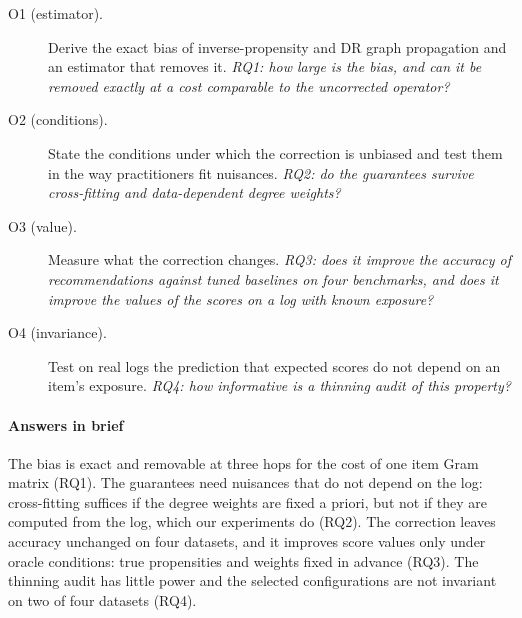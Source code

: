 \documentclass[preprint,review,12pt,authoryear]{elsarticle}
\theoremstyle{definition}
\begin{document}
\begin{description}
\item[O1 (estimator).] Derive the exact bias of inverse-propensity and DR graph
propagation and an estimator that removes it. \emph{RQ1: how large is the bias,
and can it be removed exactly at a cost comparable to the uncorrected operator?}
\item[O2 (conditions).] State the conditions under which the correction is
unbiased and test them in the way practitioners fit nuisances. \emph{RQ2: do the
guarantees survive cross-fitting and data-dependent degree weights?}
\item[O3 (value).] Measure what the correction changes. \emph{RQ3: does it
improve the accuracy of recommendations against tuned baselines on four
benchmarks, and does it improve the values of the scores on a log with known
exposure?}
\item[O4 (invariance).] Test on real logs the prediction that expected scores do
not depend on an item's exposure. \emph{RQ4: how informative is a thinning audit
of this property?}
\end{description}

\paragraph{Answers in brief} The bias is exact and removable at three hops for
the cost of one item Gram matrix (RQ1). The guarantees need nuisances that do
not depend on the log: cross-fitting suffices if the degree weights are fixed a
priori, but not if they are computed from the log, which our experiments do
(RQ2). The correction leaves accuracy unchanged on four datasets, and it
improves score values only under oracle conditions: true propensities and
weights fixed in advance (RQ3). The thinning audit has little power and the
selected configurations are not invariant on two of four datasets (RQ4).
\end{document}
